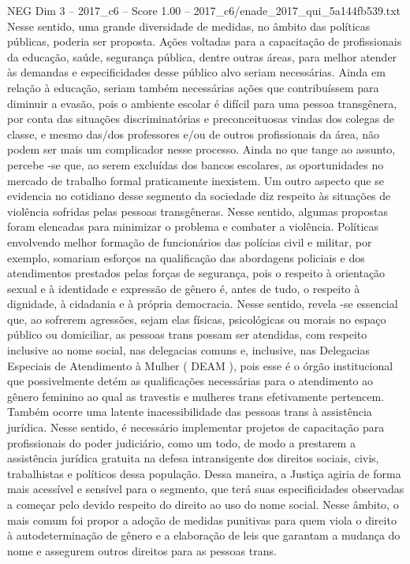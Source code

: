 \begin{textsample}{NEG Dim 3 – 2017\_c6 – Score 1.00 – 2017\_c6/enade\_2017\_qui\_5a144fb539.txt}
Nesse sentido, uma grande diversidade de medidas, no âmbito das políticas públicas, poderia ser proposta.
Ações voltadas para a capacitação de profissionais da educação, saúde, segurança pública, dentre outras áreas, para melhor atender às demandas e especificidades desse público alvo seriam necessárias.
Ainda em relação à educação, seriam também necessárias ações que contribuíssem para diminuir a evasão, pois o ambiente escolar é difícil para uma pessoa transgênera, por conta das situações discriminatórias e preconceituosas vindas dos colegas de classe, e mesmo das/dos professores e/ou de outros profissionais da área, não podem ser mais um complicador nesse processo.
Ainda no que tange ao assunto, percebe -se que, ao serem excluídas dos bancos escolares, as oportunidades no mercado de trabalho formal praticamente inexistem.
Um outro aspecto que se evidencia no cotidiano desse segmento da sociedade diz respeito às situações de violência sofridas pelas pessoas transgêneras.
Nesse sentido, algumas propostas foram elencadas para minimizar o problema e combater a violência.
Políticas envolvendo melhor formação de funcionários das polícias civil e militar, por exemplo, somariam esforços na qualificação das abordagens policiais e dos atendimentos prestados pelas forças de segurança, pois o respeito à orientação sexual e à identidade e expressão de gênero é, antes de tudo, o respeito à dignidade, à cidadania e à própria democracia.
Nesse sentido, revela -se essencial que, ao sofrerem agressões, sejam elas físicas, psicológicas ou morais no espaço público ou domiciliar, as pessoas trans possam ser atendidas, com respeito inclusive ao nome social, nas delegacias comuns e, inclusive, nas Delegacias Especiais de Atendimento à Mulher ( DEAM ), pois esse é o órgão institucional que possivelmente detém as qualificações necessárias para o atendimento ao gênero feminino ao qual as travestis e mulheres trans efetivamente pertencem.
Também ocorre uma latente inacessibilidade das pessoas trans à assistência jurídica.
Nesse sentido, é necessário implementar projetos de capacitação para profissionais do poder judiciário, como um todo, de modo a prestarem a assistência jurídica gratuita na defesa intransigente dos direitos sociais, civis, trabalhistas e políticos dessa população.
Dessa maneira, a Justiça agiria de forma mais acessível e sensível para o segmento, que terá suas especificidades observadas a começar pelo devido respeito do direito ao uso do nome social.
Nesse âmbito, o mais comum foi propor a adoção de medidas punitivas para quem viola o direito à autodeterminação de gênero e a elaboração de leis que garantam a mudança do nome e assegurem outros direitos para as pessoas trans.

\end{textsample}

